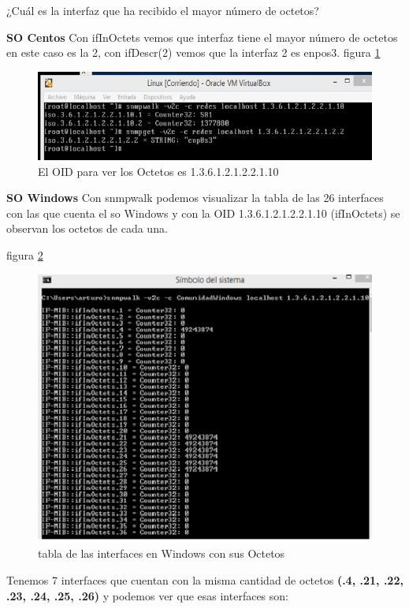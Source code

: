 \item ¿Cuál es la interfaz que ha recibido el mayor número de octetos?

\textbf{SO Centos}
Con ifInOctets vemos que interfaz tiene el mayor número de octetos en este caso es la 2, con ifDescr(2) vemos que la interfaz  2 es enpos3.
figura  \ref{image:Pregunta4O}
\FloatBarrier
\begin{figure}[htbp!]
		\centering
		    \includegraphics[width=.9 \textwidth]{../images/Pregunta4O.png} 
		\caption{El OID para ver los Octetos es 1.3.6.1.2.1.2.2.1.10}
		\label{image:Pregunta4O}
\end{figure}
\FloatBarrier

\textbf{SO Windows}
Con snmpwalk  podemos visualizar la tabla de las 26 interfaces con las que cuenta el so Windows y con la OID 1.3.6.1.2.1.2.2.1.10 (ifInOctets) se observan los octetos de cada una.

figura  \ref{image:Pregunta4W}
\FloatBarrier
\begin{figure}[htbp!]
		\centering
		    \includegraphics[width=.7 \textwidth]{../images/Pregunta4W.png} 
		\caption{tabla de las interfaces en Windows con sus Octetos}
		\label{image:Pregunta4W}
\end{figure}
\FloatBarrier

 Tenemos 7 interfaces que cuentan con la misma cantidad de octetos \textbf{(.4, .21, .22, .23, .24, .25, .26)} y podemos ver que esas interfaces son:
 
